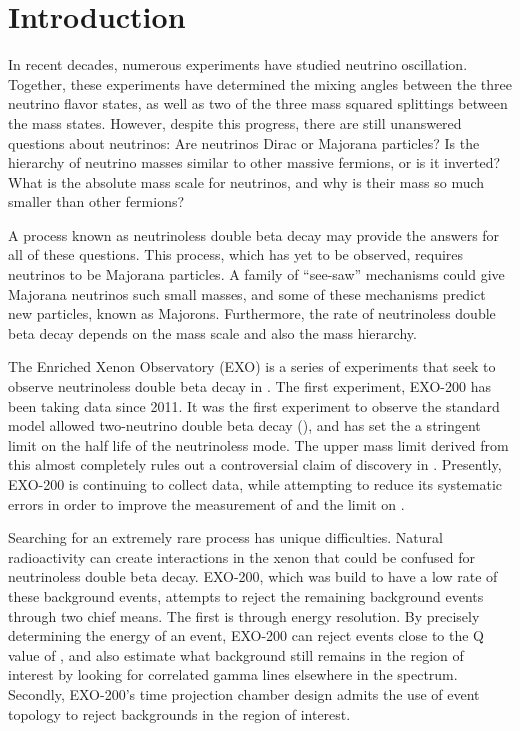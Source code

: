 \documentclass[herrin-thesis.tex]{subfiles}
\begin{document}
\chapter{Introduction}

In recent decades, numerous experiments have studied neutrino oscillation. Together, these experiments have determined the mixing angles between the three neutrino flavor states, as well as two of the three mass squared splittings between the mass states. However, despite this progress, there are still unanswered questions about neutrinos: Are neutrinos Dirac or Majorana particles? Is the hierarchy of neutrino masses similar to other massive fermions, or is it inverted? What is the absolute mass scale for neutrinos, and why is their mass so much smaller than other fermions?

A process known as neutrinoless double beta decay may provide the answers for all of these questions. This process, which has yet to be observed, requires neutrinos to be Majorana particles. A family of ``see-saw'' mechanisms could give Majorana neutrinos such small masses, and some of these mechanisms predict new particles, known as Majorons. Furthermore, the rate of neutrinoless double beta decay depends on the mass scale and also the mass hierarchy. 

The Enriched Xenon Observatory (EXO) is a series of experiments that seek to observe neutrinoless double beta decay in . The first experiment, EXO-200 has been taking data since 2011. It was the first experiment to observe the standard model allowed two-neutrino double beta decay (\twonu)\cite{Ackerman:2011gz}, and has set the a stringent limit on the half life of the neutrinoless mode\cite{Auger:2012ar}. The upper mass limit derived from this almost completely rules out a controversial claim of discovery in \cite{KlapdorKleingrothaus:2006ff}. Presently, EXO-200 is continuing to collect data, while attempting to reduce its systematic errors in order to improve the measurement of \twonu and the limit on \zeronu.

Searching for an extremely rare process has unique difficulties. Natural radioactivity can create interactions in the xenon that could be confused for neutrinoless double beta decay. EXO-200, which was build to have a low rate of these background events, attempts to reject the remaining background events through two chief means. The first is through energy resolution. By precisely determining the energy of an event, EXO-200 can reject events close to the Q value of , and also estimate what background still remains in the region of interest by looking for correlated gamma lines elsewhere in the spectrum. Secondly, EXO-200's time projection chamber design admits the use of event topology to reject backgrounds in the region of interest.
\end{document}
